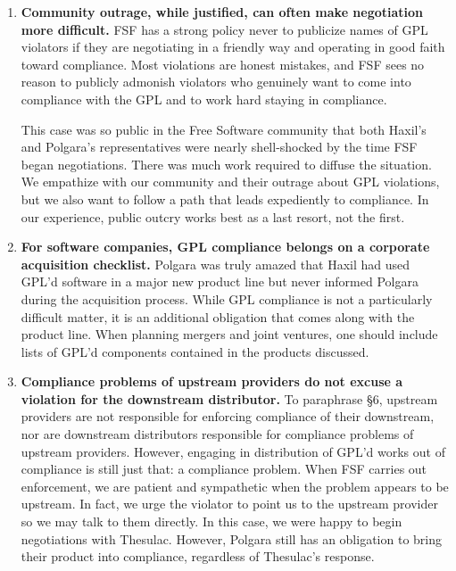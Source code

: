 \begin{enumerate}

\item {\bf Community outrage, while justified, can often make negotiation
  more difficult.}  FSF has a strong policy never to publicize names of
  GPL violators if they are negotiating in a friendly way and operating in
  good faith toward compliance. Most violations are honest mistakes, and
  FSF sees no reason to publicly admonish violators who genuinely want to
  come into compliance with the GPL and to work hard staying in compliance.

  This case was so public in the Free Software community that both Haxil's
  and Polgara's representatives were nearly shell-shocked by the time FSF
  began negotiations. There was much work required to diffuse the
  situation. We empathize with our community and their outrage about GPL
  violations, but we also want to follow a path that leads expediently
  to compliance. In our experience, public outcry works best as a last
  resort, not the first.

\item {\bf For software companies, GPL compliance belongs on a corporate
  acquisition checklist. }  Polgara was truly amazed that Haxil had used
  GPL'd software in a major new product line but never informed Polgara
  during the acquisition process. While GPL compliance is not a
  particularly difficult matter, it is an additional obligation that comes
  along with the product line. When planning mergers and joint ventures,
  one should include lists of GPL'd components contained in the products
  discussed.

\item {\bf Compliance problems of upstream providers do not excuse a
  violation for the downstream distributor.}  To paraphrase \S 6, upstream
  providers are not responsible for enforcing compliance of their
  downstream, nor are downstream distributors responsible for compliance
  problems of upstream providers. However, engaging in distribution of
  GPL'd works out of compliance is still just that: a compliance problem.
  When FSF carries out enforcement, we are patient and sympathetic when
  the problem appears to be upstream. In fact, we urge the violator to
  point us to the upstream provider so we may talk to them directly. In
  this case, we were happy to begin negotiations with Thesulac. However,
  Polgara still has an obligation to bring their product into compliance,
  regardless of Thesulac's response.


\end{enumerate}
